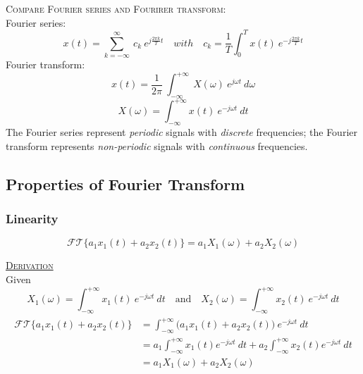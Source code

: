 \documentclass[12pt,a4paper]{article}
\begin{document}
\begin{tcolorbox}[breakable]
\textsc{Compare Fourier series and Fourirer transform:}\\
Fourier series:
\[ x(t) =  \sum_{k=-\infty}^{\infty} \ c_{k} \ e^{j\frac{2\pi k}{T}t} \quad with \quad c_{k} = \frac{1}{T} \int_{0}^{T} x(t) \ e^{-j\frac{2\pi k}{T}t} \]
Fourier transform:
\[ x(t) = \frac{1}{2 \pi} \ \int_{-\infty}^{+\infty} \ X( \omega) \ e^{j \omega t} \ d\omega \]
\[ X(\omega) =  \int_{-\infty}^{+\infty} x(t) \ e^{-j \omega t} \ dt \]
The Fourier series represent \textit{periodic} signals with \textit{discrete} frequencies; the Fourier transform represents \textit{non-periodic} signals with \textit{continuous} frequencies.
\end{tcolorbox}

\subsection{Properties of Fourier Transform}

\subsubsection{Linearity}
\[ \mathcal{FT} \{ a_{1}x_{1}(t)+a_{2}x_{2}(t)\} = a_{1}X_{1}(\omega)+a_{2}X_{2}(\omega) \]
\begin{tcolorbox}[breakable]
\underline{\textsc{Derivation}}\\
Given
\[ X_{1}(\omega) =  \int_{-\infty}^{+\infty} x_{1}(t) \ e^{-j \omega t} \ dt \quad \text{and} \quad X_{2}(\omega) =  \int_{-\infty}^{+\infty} x_{2}(t) \ e^{-j \omega t} \ dt \]
\begin{align*}
\begin{split}
\mathcal{FT} \{ a_{1}x_{1}(t)+a_{2}x_{2}(t) \} 
&=  \int_{-\infty}^{+\infty} \big( a_{1}x_{1}(t)+a_{2}x_{2}(t)\big) \ e^{-j \omega t} \ dt  \\
&=  a_{1}\int_{-\infty}^{+\infty}x_{1}(t)e^{-j \omega t} \ dt + a_{2}\int_{-\infty}^{+\infty}x_{2}(t) e^{-j \omega t} \ dt \\
& = a_{1}X_{1}(\omega)+a_{2}X_{2}(\omega)
\end{split} \end{align*} \end{tcolorbox}
\end{document}
